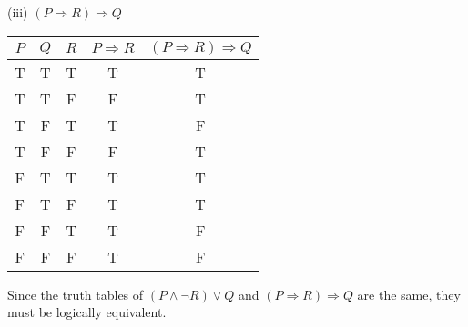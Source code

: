 \documentclass{article}
\begin{document}
(iii) $(P \Rightarrow R) \Rightarrow Q$\\
\begin{tabular}{|c|c|c|c|c|}
    \hline
    $P$ & $Q$ & $R$ & $P \Rightarrow R$ & $(P \Rightarrow R) \Rightarrow Q$ \\
    \hline
    T   & T   & T   & T                 & T                                 \\
    T   & T   & F   & F                 & T                                 \\
    T   & F   & T   & T                 & F                                 \\
    T   & F   & F   & F                 & T                                 \\
    F   & T   & T   & T                 & T                                 \\
    F   & T   & F   & T                 & T                                 \\
    F   & F   & T   & T                 & F                                 \\
    F   & F   & F   & T                 & F                                 \\
    \hline
\end{tabular}

Since the truth tables of $(P \land \neg R) \lor Q$ and $(P \Rightarrow R) \Rightarrow Q$ are the same,
they must be logically equivalent.
\end{document}
